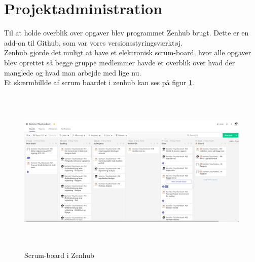 \section{Projektadministration}
Til at holde overblik over opgaver blev programmet Zenhub brugt. Dette er en add-on til Github, som var vores versionsstyringsværktøj. \\
Zenhub gjorde det muligt at have et elektronisk scrum-board, hvor alle opgaver blev oprettet så begge gruppe medlemmer havde et overblik over hvad der manglede og hvad man arbejde med lige nu. \\
Et skærmbillde af scrum boardet i zenhub kan ses på figur \ref{fig:ZenhubScrum}.

\begin{figure} [H]
	\begin{center}
		\includegraphics[height=8cm, width=15cm]{Projektadministration/Zenhub}
	\end{center}
	\caption{Scrum-board i Zenhub}
	\label{fig:ZenhubScrum}
\end{figure} 
